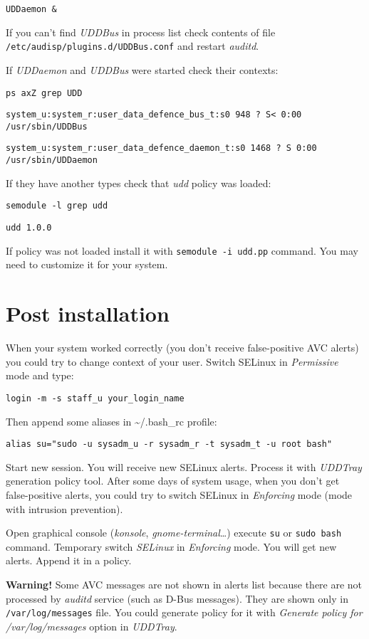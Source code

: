 \texttt{UDDaemon \&}

If you can't find \emph{UDDBus} in process list check contents of file
\texttt{/etc/audisp/plugins.d/UDDBus.conf} and restart \emph{auditd}.

If \emph{UDDaemon} and \emph{UDDBus} were started check their contexts:

\texttt{ps axZ \textbar{} grep UDD}

\texttt{system\_u:system\_r:user\_data\_defence\_bus\_t:s0 948 ? S\textless{}   0:00 /usr/sbin/UDDBus}

\texttt{system\_u:system\_r:user\_data\_defence\_daemon\_t:s0 1468 ? S   0:00 /usr/sbin/UDDaemon}

If they have another types check that \emph{udd} policy was loaded:

\texttt{semodule -l \textbar{} grep udd}

\texttt{udd     1.0.0}

If policy was not loaded install it with \texttt{semodule -i udd.pp}
command. You may need to customize it for your system.

\section{Post installation}

When your system worked correctly (you don't receive false-positive AVC
alerts) you could try to change context of your user. Switch SELinux in
\emph{Permissive} mode and type:

\texttt{login -m -s staff\_u your\_login\_name}

Then append some aliases in \textasciitilde{}/.bash\_rc profile:

\texttt{alias su="sudo -u sysadm\_u -r sysadm\_r -t sysadm\_t -u root bash"}

Start new session. You will receive new SELinux alerts. Process it with
\emph{UDDTray} generation policy tool. After some days of system usage,
when you don't get false-positive alerts, you could try to switch
SELinux in \emph{Enforcing} mode (mode with intrusion prevention).

Open graphical console (\emph{konsole}, \emph{gnome-terminal}\ldots{})
execute \texttt{su} or \texttt{sudo bash} command. Temporary switch
\emph{SELinux} in \emph{Enforcing} mode. You will get new alerts. Append
it in a policy.

\textbf{Warning!} Some AVC messages are not shown in alerts list because
there are not processed by \emph{auditd} service (such as D-Bus
messages). They are shown only in \texttt{/var/log/messages} file. You
could generate policy for it with \emph{Generate policy for
/var/log/messages} option in \emph{UDDTray}.

